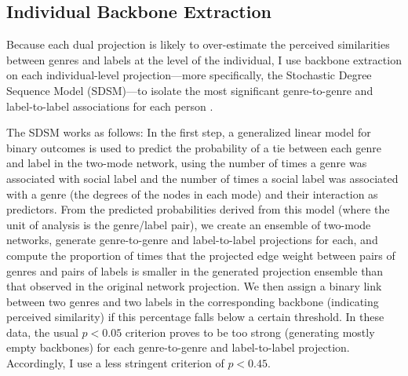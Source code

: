 \documentclass[12pt]{article}
\begin{document}
\subsection*{Individual Backbone Extraction}
Because each dual projection is likely to over-estimate the perceived similarities between genres and labels at the level of the individual, I use backbone extraction on each individual-level projection---more specifically, the Stochastic Degree Sequence Model (SDSM)---to isolate the most significant genre-to-genre and label-to-label associations for each person \citep{neal2014backbone-b29}. 

The SDSM works as follows: In the first step, a generalized linear model for binary outcomes is used to predict the probability of a tie between each genre and label in the two-mode network, using the number of times a genre was associated with social label and the number of times a social label was associated with a genre (the degrees of the nodes in each mode) and their interaction as predictors. From the predicted probabilities derived from this model (where the unit of analysis is the genre/label pair), we create an ensemble of two-mode networks, generate genre-to-genre and label-to-label projections for each, and compute the proportion of times that the projected edge weight between pairs of genres and pairs of labels is smaller in the generated projection ensemble than that observed in the original network projection. We then assign a binary link between two genres and two labels in the corresponding backbone (indicating perceived similarity) if this percentage falls below a certain threshold. In these data, the usual $p < 0.05$ criterion proves to be too strong (generating mostly empty backbones) for each genre-to-genre and label-to-label projection. Accordingly, I use a less stringent criterion of $p < 0.45$.  
\end{document}
